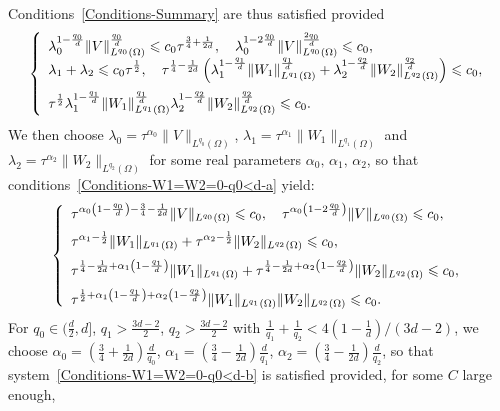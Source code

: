 \documentclass[AHL,Unicode,longabstracts]{cedram}
\newcommand*\ds{\displaystyle}
\renewcommand{\leq}{\leqslant}
\begin{document}
Conditions~\eqref{Conditions-Summary} are thus satisfied provided
\begin{equation}\label{Conditions-W1=W2=0-q0<d-a}
\left\{
\begin{array}{l}
\ds \lambda_0^{1 - \frac{q_0}{d}} \|V \|_{L^{q_0}(\Omega)}^{\frac{q_0}{d}} \leq c_0 \tau^{\frac{3}{4}+\frac{1}{2d}},
\quad
\lambda_0^{1- 2\frac{q_0}{d}} \|V \|_{L^{q_0}(\Omega)}^{\frac{2q_0}{d}} \leq c_0,
\\[0.15em]
\ds
\lambda_1 + \lambda_2 \leq c_0 \tau^{\frac{1}{2}}, \quad
\tau^{\frac{1}{4}-\frac{1}{2d}} \left(\lambda_1^{1- \frac{q_1}{d}} \| W_{1} \|_{L^{q_1}(\Omega)}^{ \frac{q_1}{d}} + \lambda_2^{1- \frac{q_2}{d}} \| W_{2} \|_{L^{q_2}(\Omega)}^{ \frac{q_2}{d}}\right) \leq c_0,
\medskip
\\
\ds \tau^{\frac{1}{2}} \lambda_1^{1- \frac{q_1}{d}} \| W_{1} \|_{L^{q_1}(\Omega)}^{ \frac{q_1}{d}} \lambda_2^{1- \frac{q_2}{d}} \| W_{2} \|_{L^{q_2}(\Omega)}^{ \frac{q_2}{d}} \leq c_0.
\end{array}\right.
\end{equation}
We then choose $\lambda_0 = \tau^{\alpha_0} \| V\|_{L^{q_0}(\Omega)}$, $\lambda_1 = \tau^{\alpha_1} \| W_1 \|_{L^{q_1}(\Omega)}$ and $\lambda_2 = \tau^{\alpha_2} \| W_2 \|_{L^{q_2}(\Omega)}$ for some real parameters $\alpha_0,\, \alpha_1, \, \alpha_2$, so that conditions~\eqref{Conditions-W1=W2=0-q0<d-a} yield:
\begin{equation}\label{Conditions-W1=W2=0-q0<d-b}
\left\{
\begin{array}{l}
\ds
\tau^{\alpha_0\left(1 - \frac{q_0}{d}\right)-\frac{3}{4} - \frac{1}{2d}} \|V \|_{L^{q_0}(\Omega)} \leq c_0,
\quad
\tau^{\alpha_0\left(1 - 2 \frac{q_0}{d}\right)} \|V \|_{L^{q_0}(\Omega)} \leq c_0,
\medskip
\\
\ds
\tau^{\alpha_1 - \frac{1}{2}} \| W_1\|_{L^{q_1}(\Omega)} + \tau^{\alpha_2 - \frac{1}{2}} \| W_2\|_{L^{q_2}(\Omega)} \leq c_0, \quad
\medskip
\\
\ds \tau^{\frac{1}{4}-\frac{1}{2d} + \alpha_1\left(1- \frac{q_1}{d}\right)} \| W_{1} \|_{L^{q_1}(\Omega)} +
\tau^{\frac{1}{4}-\frac{1}{2d} + \alpha_2\left(1- \frac{q_2}{d}\right)} \| W_{2} \|_{L^{q_2}(\Omega)}
\leq c_0,
\medskip
\\
\ds
\tau^{\frac{1}{2}+ \alpha_1\left(1- \frac{q_1}{d}\right)+ \alpha_2\left(1- \frac{q_2}{d}\right)} \| W_{1} \|_{L^{q_1}(\Omega)} \| W_{2} \|_{L^{q_2}(\Omega)} \leq c_0.
\end{array}\right.
\end{equation}
For $q_0 \in (\frac{d}{2}, d]$, $q_1 > \frac{3d-2}{2} $, $q_2 > \frac{3d-2}{2} $ with $\frac{1}{q_1} +\frac{1}{q_2} < 4(1-\frac{1}{d})/(3d -2)$, we choose $\alpha_0 = (\frac{3}{4} + \frac{1}{2d})\frac{d}{q_0}$, $\alpha_1 = (\frac{3}{4} - \frac{1}{2d}) \frac{d}{q_1}$, $\alpha_2 = (\frac{3}{4} - \frac{1}{2d}) \frac{d}{q_2}$, so that system~\eqref{Conditions-W1=W2=0-q0<d-b} is satisfied provided, for some $C$ large enough,
\end{document}

